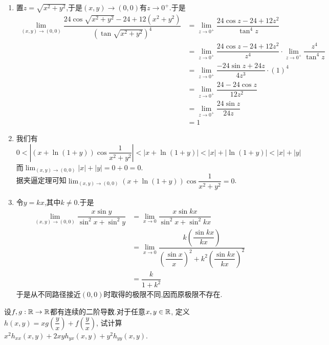 \documentclass{ctexart}
\begin{document}
\begin{solution}[Solution.]
    \begin{enumerate}[label=\textbf{(\arabic*)},leftmargin=*]
        \item 置$z=\sqrt{x^2+y^2}$,于是$(x,y)\to(0,0)$有$z\to 0^+$.于是
            $$\begin{aligned}
                \lim_{(x,y)\to(0,0)}\dfrac{24\cos\sqrt{x^2+y^2}-24+12\left(x^2+y^2\right)}{\left(\tan\sqrt{x^2+y^2}\right)^4}
                &= \lim_{z\to 0^+}\dfrac{24\cos z-24+12z^2}{\tan^4 z} \\
                &= \lim_{z\to 0^+}\dfrac{24\cos z-24+12z^2}{z^4}\cdot\lim_{z\to 0^+}\dfrac{z^4}{\tan^4 z} \\
                &= \lim_{z\to 0^+}\dfrac{-24\sin z+24z}{4z^3}\cdot(1)^4\\
                &= \lim_{z\to 0^+}\dfrac{24-24\cos z}{12z^2} \\
                &= \lim_{z\to 0^+}\dfrac{24\sin z}{24z}\\
                &= 1
            \end{aligned}$$
        \item 我们有$$0<\left|\left(x+\ln(1+y)\right)\cos\dfrac{1}{x^2+y^2}\right|<\left|x+\ln(1+y)\right|<\left|x\right|+\left|\ln(1+y)\right|<\left|x\right|+\left|y\right|$$
            而$\displaystyle\lim_{(x,y)\to(0,0)}|x|+|y|=0+0=0$.\\
            据夹逼定理可知$\displaystyle\lim_{(x,y)\to(0,0)}\left(x+\ln(1+y)\right)\cos\dfrac{1}{x^2+y^2}=0$.
        \item 令$y=kx$,其中$k\neq 0$.于是
            $$\begin{aligned}
                \lim_{(x,y)\to(0,0)}\dfrac{x\sin y}{\sin^2x+\sin^2y}
                &= \lim_{x\to0}\dfrac{x\sin kx}{\sin^2x+\sin^2kx} \\
                &= \lim_{x\to0}\dfrac{k\left(\dfrac{\sin kx}{kx}\right)}{\left(\dfrac{\sin x}{x}\right)^2+k^2\left(\dfrac{\sin kx}{kx}\right)^2} \\
                &= \dfrac{k}{1+k^2}
            \end{aligned}$$
            于是从不同路径接近$(0,0)$时取得的极限不同,因而原极限不存在.
    \end{enumerate}
\end{solution}
\begin{problem}[3.(10\songti{分})]
    设$f,g:\mathbb{R}\to\mathbb{R}$都有连续的二阶导数.对于任意$x,y\in\mathbb{R}$,
    定义$h(x,y)=xg\left(\dfrac{y}{x}\right)+f\left(\dfrac{y}{x}\right)$,
    试计算$x^2h_{xx}(x,y)+2xyh_{yx}(x,y)+y^2h_{yy}(x,y)$.
\end{problem}
\end{document}
